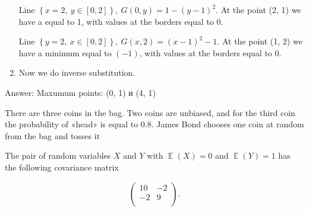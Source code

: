 \documentclass[addpoints]{exam} %
\DeclareMathOperator{\E}{\mathbb{E}}
\let\P\relax
\DeclareMathOperator{\P}{\mathbb{P}}
\begin{document}
\begin{questions}
\begin{solution}
\begin{enumerate}
Line $\left\{x=2,\ y\in \left[0,2\right]\right\},\ G\left(0,y\right)=1-{\left(y-1\right)}^2$. At the point (2, 1) we have a \textbf{} equal to 1, with values at the borders equal to $0$.

Line $\left\{y=2,\ x\in \left[0,2\right]\right\},\ G\left(x,2\right)={\left(x-1\right)}^2-1$. At the point (1, 2) we have a minimum equal to $(-1)$, with values at the borders equal to 0.

\item  Now we do inverse substitution.
\end{enumerate}

Answer: Maxumum points: (0, 1) и (4, 1)


\end{solution}

\newpage

\question
There are three coins in the bag. Two coins are unbiased, and for the third coin the probability of «head» is equal to $0.8$. James Bond chooses one coin at random from the bag and tosses it



\question
The pair of random variables $X$ and $Y$ with $\E(X)=0$ and $\E(Y)=1$ has the following covariance matrix


\[
\begin{pmatrix}
10 & -2 \\
-2 & 9 \\
\end{pmatrix}.
\]




\end{questions}
\end{document}
